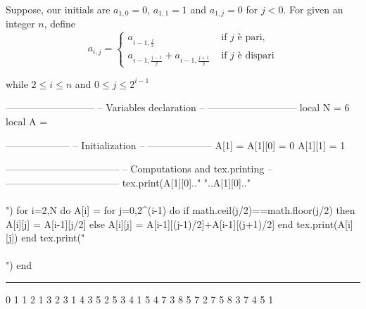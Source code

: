 \documentclass{article}
\begin{document}
Suppose, our initials are $a_{1,0}=0$, $a_{1,1}=1$ and $a_{1,j}=0$ for $j<0$. For given an integer $n$, define
\[
a_{i,j}=%
\begin{cases}
a_{i-1,\frac{j}{2}}                          & \text{ if $j$ è pari},\\
 a_{i-1,\frac{j-1}{2}}+a_{i-1,\frac{j+1}{2}} & \text{ if $j$ è dispari}  
\end{cases}
\]

while $2\leq i \leq n$ and $0\leq j \leq 2^{i-1}$

\noindent
\begin{luacode*}
---------------------------
-- Variables declaration --
---------------------------
local N    = 6
local A    = {}

--------------------
-- Initialization --
--------------------
A[1]    = {}
A[1][0] = 0
A[1][1] = 1

-----------------------------------
-- Computations and tex.printing --
-----------------------------------
tex.print(A[1][0].." "..A[1][0].."\\\\")
for i=2,N do
    A[i] = {}
    for j=0,2^(i-1) do
        if math.ceil(j/2)==math.floor(j/2) then 
            A[i][j] = A[i-1][j/2]
        else
            A[i][j] = A[i-1][(j-1)/2]+A[i-1][(j+1)/2]
        end
        tex.print(A[i][j])
    end
    tex.print("\\\\")
end
\end{luacode*}
\rule{\textwidth}{1pt}
0 1 1 2 1 3 2 3 1 4 3 5 2 5 3 4 1 5 4 7 3 8 5 7 2 7 5 8 3 7 4 5 1
\end{document}

